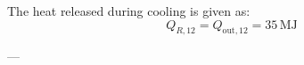 The heat released during cooling is given as:  
\[
Q_{R,12} = Q_{\text{out},12} = 35 \, \text{MJ}
\]

---